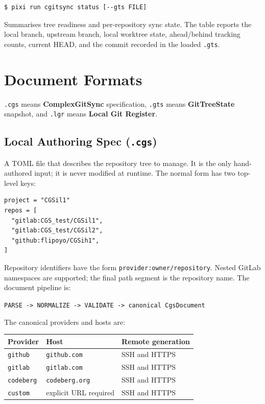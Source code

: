 \begin{lstlisting}[language=bash]
$ pixi run cgitsync status [--gts FILE]
\end{lstlisting}

Summarises tree readiness and per-repository sync state. The table reports the
local branch, upstream branch, local worktree state, ahead/behind tracking
counts, current HEAD, and the commit recorded in the loaded \texttt{.gts}.

\section{Document Formats}

\texttt{.cgs} means \textbf{ComplexGitSync} specification, \texttt{.gts} means
\textbf{GitTreeState} snapshot, and \texttt{.lgr} means
\textbf{Local Git Register}.

\subsection{Local Authoring Spec (\texttt{.cgs})}

A TOML file that describes the repository tree to manage. It is the only
hand-authored input; it is never modified at runtime.  The normal form has two
top-level keys:

\begin{lstlisting}
project = "CGSil1"
repos = [
  "gitlab:CGS_test/CGSil1",
  "gitlab:CGS_test/CGSil2",
  "github:flipoyo/CGSih1",
]
\end{lstlisting}

Repository identifiers have the form
\texttt{provider:owner/repository}. Nested GitLab namespaces are supported;
the final path segment is the repository name. The document pipeline is:

\begin{center}
\texttt{PARSE -> NORMALIZE -> VALIDATE -> canonical CgsDocument}
\end{center}

The canonical providers and hosts are:

\begin{center}
\begin{tabular}{lll}
\textbf{Provider} & \textbf{Host} & \textbf{Remote generation} \\
\hline
\texttt{github}   & \texttt{github.com}   & SSH and HTTPS \\
\texttt{gitlab}   & \texttt{gitlab.com}   & SSH and HTTPS \\
\texttt{codeberg} & \texttt{codeberg.org} & SSH and HTTPS \\
\texttt{custom}   & explicit URL required & SSH and HTTPS \\
\end{tabular}
\end{center}

